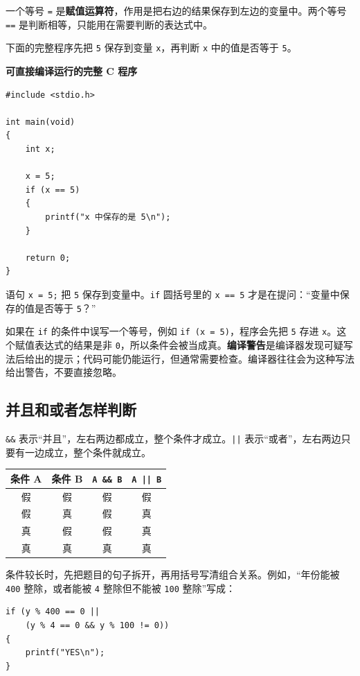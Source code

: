 \documentclass[UTF8,zihao=-4,fontset=windows]{ctexart}
\newcommand{\term}[1]{\textbf{\color{navy}#1}}
\newcommand{\clabel}{\noindent\textbf{可直接编译运行的完整 C 程序}\par\nopagebreak}
\begin{document}
一个等号 \verb|=| 是\term{赋值运算符}，作用是把右边的结果保存到左边的变量中。两个等号 \verb|==| 是判断相等，只能用在需要判断的表达式中。

下面的完整程序先把 \verb|5| 保存到变量 \verb|x|，再判断 \verb|x| 中的值是否等于 \verb|5|。

\clabel
\begin{lstlisting}[style=cstyle]
#include <stdio.h>

int main(void)
{
    int x;

    x = 5;
    if (x == 5)
    {
        printf("x 中保存的是 5\n");
    }

    return 0;
}
\end{lstlisting}

语句 \verb|x = 5;| 把 \verb|5| 保存到变量中。\verb|if| 圆括号里的 \verb|x == 5| 才是在提问：“变量中保存的值是否等于 \verb|5|？”

如果在 \verb|if| 的条件中误写一个等号，例如 \verb|if (x = 5)|，程序会先把 \verb|5| 存进 \verb|x|。这个赋值表达式的结果是非 \verb|0|，所以条件会被当成真。\term{编译警告}是编译器发现可疑写法后给出的提示；代码可能仍能运行，但通常需要检查。编译器往往会为这种写法给出警告，不要直接忽略。

\subsection{并且和或者怎样判断}

\verb|&&| 表示“并且”，左右两边都成立，整个条件才成立。\verb+||+ 表示“或者”，左右两边只要有一边成立，整个条件就成立。

\begin{center}
\begin{tabular}{cccc}
\toprule
条件 A & 条件 B & \texttt{A \&\& B} & \texttt{A || B} \\
\midrule
假 & 假 & 假 & 假 \\
假 & 真 & 假 & 真 \\
真 & 假 & 假 & 真 \\
真 & 真 & 真 & 真 \\
\bottomrule
\end{tabular}
\end{center}

条件较长时，先把题目的句子拆开，再用括号写清组合关系。例如，“年份能被 \verb|400| 整除，或者能被 \verb|4| 整除但不能被 \verb|100| 整除”写成：

\begin{lstlisting}[style=cstyle]
if (y % 400 == 0 ||
    (y % 4 == 0 && y % 100 != 0))
{
    printf("YES\n");
}
\end{lstlisting}
\end{document}
